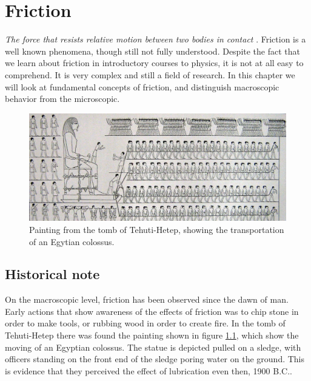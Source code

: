 \documentclass[twoside,english]{uiofysmaster}
\begin{document}
\chapter{Friction}
\textit{The force that resists relative motion between two bodies in contact} \cite{frictionDefinition}. 
Friction is a well known phenomena, though still not fully understood.
Despite the fact that we learn about friction in introductory courses to physics, it is not at all easy to comprehend. 
It is very complex and still a field of research.
In this chapter we will look at fundamental concepts of friction, and distinguish macroscopic behavior from the microscopic.
 
\begin{figure}[H]
	\centering
	\includegraphics[width=0.99\linewidth]{figures/friction/Colossus.jpg}
	\caption{Painting from the tomb of Tehuti-Hetep, showing the transportation of an Egytian colossus.}
	\label{fig:Colossus}
\end{figure}
\section{Historical note}
On the macroscopic level, friction has been observed since the dawn of man. 
Early actions that show awareness of the effects of friction was to chip stone in order to make tools, or rubbing wood in order to create fire. 
In the tomb of Tehuti-Hetep there was found the painting shown in figure \ref{fig:Colossus}, which show the moving of an Egyptian colossus. 
The statue is depicted pulled on a sledge, with officers standing on the front end of the sledge poring water on the ground. 
This is evidence that they perceived the effect of lubrication even then, 1900 B.C..   
\end{document}
